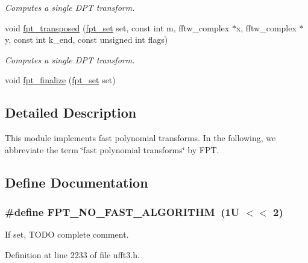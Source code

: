 \begin{CompactItemize}
\begin{CompactList}\small\item\em Computes a single DPT transform. \item\end{CompactList}\item 
void \hyperlink{group__fpt_gbacb4c41365ca6f32b72688376aa86e1}{fpt\_\-transposed} (\hyperlink{group__fpt_g73d630ac21d6474ba0693f124d465e15}{fpt\_\-set} set, const int m, fftw\_\-complex $\ast$x, fftw\_\-complex $\ast$y, const int k\_\-end, const unsigned int flags)
\begin{CompactList}\small\item\em Computes a single DPT transform. \item\end{CompactList}\item 
\hypertarget{group__fpt_g7f2a1b915af8d0e7f2eb2f37ddb6772c}{
void \hyperlink{group__fpt_g7f2a1b915af8d0e7f2eb2f37ddb6772c}{fpt\_\-finalize} (\hyperlink{group__fpt_g73d630ac21d6474ba0693f124d465e15}{fpt\_\-set} set)}
\label{group__fpt_g7f2a1b915af8d0e7f2eb2f37ddb6772c}

\end{CompactItemize}


\subsection{Detailed Description}
This module implements fast polynomial transforms. In the following, we abbreviate the term \char`\"{}fast polynomial transforms\char`\"{} by FPT. 

\subsection{Define Documentation}
\hypertarget{group__fpt_g33b9330253f419a91ef09a1b0d7a2667}{
\subsubsection{\setlength{\rightskip}{0pt plus 5cm}\#define FPT\_\-NO\_\-FAST\_\-ALGORITHM~(1U $<$$<$ 2)}}
\label{group__fpt_g33b9330253f419a91ef09a1b0d7a2667}


If set, TODO complete comment. 



Definition at line 2233 of file nfft3.h.

